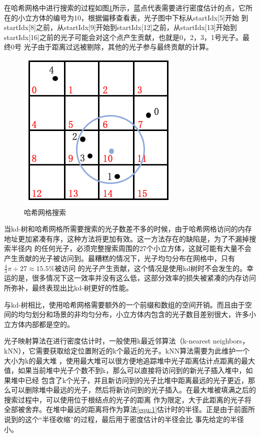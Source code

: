\documentclass[UTF8]{ctexart}
\begin{document}
        在哈希网格中进行搜索的过程如图\ref{fig:2}所示，蓝点代表需要进行密度估计的点，它所在的小立方体的编号为10，根据偏移查看表，光子图中下标从startIdx[5]开始
        到startIdx[8]之前，从startIdx[9]开始到startIdx[12]之前，从startIdx[13]开始到startIdx[16]之前的光子可能会对这个点产生贡献，也就是0，2，3，1号光子。最终0号
        光子由于距离过远被剔除，其他的光子参与最终贡献的计算。
        
        \begin{figure}[htbp]
        \centering
        \includegraphics[scale=0.6]{pic/HashGridSearch.png}
        \caption{哈希网格搜索}
        \label{fig:2}
        \end{figure}
        
        当kd-树和哈希网格所需要搜索的光子数差不多的时候，由于哈希网格访问的内存地址更加紧凑有序，这种方法将更加有效。这一方法存在的缺陷是，为了不漏掉搜索半径内
        的任何光子，必须完整搜索周围的27个小立方体，这就可能有大量不会产生贡献的光子被访问到。最糟糕的情况下，光子均匀分布在网格中，只有$\frac{4}{3}\pi\div27\approx15.5\%$被访问
        的光子产生贡献，这个情况是使用kd树时不会发生的。幸运的是，很多情况下这一效率并没有这么低，这部分效率的损失被紧凑的内存访问所弥补，最终表现出比kd-树更好的性能。
        
        与kd-树相比，使用哈希网格需要额外的一个前缀和数组的空间开销。而且由于空间的均匀划分和场景的非均匀分布，小立方体内包含的光子数目差别很大，许多小立方体内部都是空的。
        
        光子映射算法在进行密度估计时，一般使用k最近邻算法（k-nearest neighbors，kNN），它需要获取给定位置附近的k个最近的光子。kNN算法需要为此维护一个大小为k的最大堆
        \cite{jensen2000practical}，使用最大堆可以很方便地追踪堆中光子距离估计点距离的最大值，如果当前堆中光子个数不到k，那么可以直接将访问到的新光子插入堆中，如果堆中已经
        包含了k个光子，并且新访问到的光子比堆中距离最远的光子更近，那么可以删除堆中最远的光子，然后将新访问到的光子插入。在最大堆被填满之后的搜索过程中，可以使用位于根结点的光子的距离
        作为限定，大于此距离的光子将全部被舍弃。在堆中最远的距离将作为算法\ref{equ:1}估计时的半径。正是由于前面所说到的这个“半径收缩”的过程，最后用于密度估计的半径会比
        事先给定的半径小\cite{2003Photon}。
        
\end{document}

